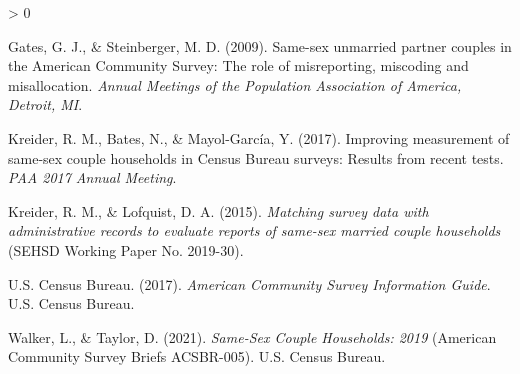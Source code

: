 \documentclass[
  11pt,
]{article}
\newlength{\cslhangindent}
\newenvironment{CSLReferences}[2] %
 {%
  \setlength{\parindent}{0pt}
  \ifodd #1 \everypar{\setlength{\hangindent}{\cslhangindent}}\ignorespaces\fi
  \ifnum #2 > 0
  \setlength{\parskip}{#2\baselineskip}
  \fi
 }%
 {}
\begin{document}
\hypertarget{refs}{}
\begin{CSLReferences}{1}{0}
\leavevmode\hypertarget{ref-gates_2009}{}%
Gates, G. J., \& Steinberger, M. D. (2009). Same-sex unmarried partner couples in the {American Community Survey}: {The} role of misreporting, miscoding and misallocation. \emph{Annual Meetings of the Population Association of America, Detroit, {MI}}.

\leavevmode\hypertarget{ref-kreider_2017}{}%
Kreider, R. M., Bates, N., \& Mayol-García, Y. (2017). Improving measurement of same-sex couple households in {Census Bureau} surveys: {Results} from recent tests. \emph{{PAA} 2017 Annual Meeting}.

\leavevmode\hypertarget{ref-kreider_2015}{}%
Kreider, R. M., \& Lofquist, D. A. (2015). \emph{Matching survey data with administrative records to evaluate reports of same-sex married couple households} (SEHSD Working Paper No. 2019-30).

\leavevmode\hypertarget{ref-u.s.censusbureau_2017}{}%
U.S. Census Bureau. (2017). \emph{American {Community Survey Information Guide}}. {U.S. Census Bureau}.

\leavevmode\hypertarget{ref-walker_2021}{}%
Walker, L., \& Taylor, D. (2021). \emph{Same-{Sex Couple Households}: 2019} (American Community Survey Briefs ACSBR-005). {U.S. Census Bureau}.

\end{CSLReferences}
\end{document}
